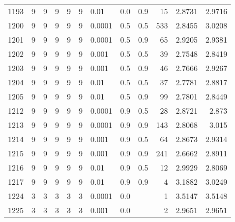 \begin{longtable}{lrrrrrlrrrrr}
 1193 &       9 & 9 & 9 & 9 & 9 &                        0.01 &      0.0 &    0.9 &      15 &                 2.8731 &                 2.9716 \\
 1200 &       9 & 9 & 9 & 9 & 9 &                      0.0001 &      0.5 &    0.5 &     533 &                 2.8455 &                 3.0208 \\
 1201 &       9 & 9 & 9 & 9 & 9 &                      0.0001 &      0.5 &    0.9 &      65 &                 2.9205 &                 2.9381 \\
 1202 &       9 & 9 & 9 & 9 & 9 &                       0.001 &      0.5 &    0.5 &      39 &                 2.7548 &                 2.8419 \\
 1203 &       9 & 9 & 9 & 9 & 9 &                       0.001 &      0.5 &    0.9 &      46 &                 2.7666 &                 2.9267 \\
 1204 &       9 & 9 & 9 & 9 & 9 &                        0.01 &      0.5 &    0.5 &      37 &                 2.7781 &                 2.8817 \\
 1205 &       9 & 9 & 9 & 9 & 9 &                        0.01 &      0.5 &    0.9 &      99 &                 2.7801 &                 2.8449 \\
 1212 &       9 & 9 & 9 & 9 & 9 &                      0.0001 &      0.9 &    0.5 &      28 &                 2.8721 &                  2.873 \\
 1213 &       9 & 9 & 9 & 9 & 9 &                      0.0001 &      0.9 &    0.9 &     143 &                 2.8068 &                  3.015 \\
 1214 &       9 & 9 & 9 & 9 & 9 &                       0.001 &      0.9 &    0.5 &      64 &                 2.8673 &                 2.9314 \\
 1215 &       9 & 9 & 9 & 9 & 9 &                       0.001 &      0.9 &    0.9 &     241 &                 2.6662 &                 2.8911 \\
 1216 &       9 & 9 & 9 & 9 & 9 &                        0.01 &      0.9 &    0.5 &      12 &                 2.9929 &                 2.8069 \\
 1217 &       9 & 9 & 9 & 9 & 9 &                        0.01 &      0.9 &    0.9 &       4 &                 3.1882 &                 3.0249 \\
 1224 &       3 & 3 & 3 & 3 & 3 &                      0.0001 &      0.0 &        &       1 &                 3.5147 &                 3.5148 \\
 1225 &       3 & 3 & 3 & 3 & 3 &                       0.001 &      0.0 &        &       2 &                 2.9651 &                 2.9651 \\

\end{longtable}
